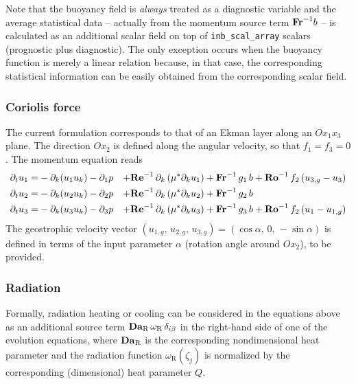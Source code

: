 Note that the buoyancy field is {\it always} treated as a diagnostic variable and the average statistical data -- actually from the momentum source term $\mathrm{\bf Fr}^{-1}b$ -- is calculated as an additional scalar field on top of {\tt   inb\_scal\_array} scalars (prognostic plus diagnostic). The only exception occurs when the buoyancy function is merely a linear relation because, in that case, the corresponding statistical information can be easily obtained from the corresponding scalar field.

\subsubsection{Coriolis force}

The current formulation corresponds to that of an Ekman layer along an $Ox_1x_3$ plane. The direction $Ox_2$ is defined along the angular velocity, so that $f_1=f_3=0$. The momentum equation reads 
\begin{subequations}
    \begin{align}
        \partial_t  u_1 =& -\partial_k ( u_1 u_k ) -\partial_1 p &
        +\mathrm{\bf Re}^{-1}\,\partial_k  \left( \mu^{*} \partial_k u_1\right) &
        +\mathrm{\bf Fr}^{-1}\, g_1\,b +\mathrm{\bf Ro}^{-1}\,f_2\,(u_{3,g}-u_3) \\
        \partial_t  u_2 =& -\partial_k ( u_2 u_k ) -\partial_2 p &
        +\mathrm{\bf Re}^{-1}\,\partial_k  \left( \mu^{*} \partial_k u_2\right) &
        +\mathrm{\bf Fr}^{-1}\, g_2\,b \\
        \partial_t  u_3 =& -\partial_k ( u_3 u_k ) -\partial_3 p &
        +\mathrm{\bf Re}^{-1}\,\partial_k  \left( \mu^{*} \partial_k u_3\right) &
        +\mathrm{\bf Fr}^{-1}\, g_3\,b +\mathrm{\bf Ro}^{-1}\,f_2\,(u_1-u_{1,g})
    \end{align}
\end{subequations}
The geostrophic velocity vector $(u_{1,g},\,u_{2,g},\,u_{3,g}) = (\cos\alpha,\,0,\,-\sin\alpha)$ is defined in terms of the input parameter $\alpha$ (rotation angle around $Ox_2$), to be provided.

\subsubsection{Radiation}

Formally, radiation heating or cooling can be considered in the equations above as an additional source term $\mathrm{\bf Da}_\mathrm{R}\,\omega_\mathrm{R}\,\delta_{i\beta}$ in the right-hand side of one of the evolution equations, where $\mathrm{\bf Da}_\mathrm{R}$ is the corresponding nondimensional heat parameter and the radiation function $\omega_\mathrm{R}(\zeta_j)$ is normalized by the corresponding (dimensional) heat parameter $Q$. 

